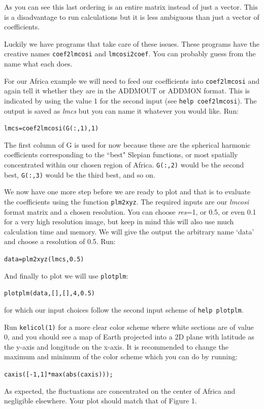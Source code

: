 \documentclass[11pt]{article}
\begin{document}
As you can see this last ordering is an entire matrix instead of just a vector. This is a disadvantage to run calculations but it is less ambiguous than just a vector of coefficients.


Luckily we have programs that take care of these issues. These programs have the creative names
\verb+coef2lmcosi+ and \verb+lmcosi2coef+. You can probably guess from the name what each does.

For our Africa example we will need to feed our coefficients into \verb+coef2lmcosi+ and again tell it whether they are in the ADDMOUT or ADDMON format. This is indicated by using the value 1 for the second input (see \verb+help coef2lmcosi+). The output is saved as \textit{lmcs} but you can name it whatever you would like. Run:

\verb+lmcs=coef2lmcosi(G(:,1),1)+

The first column of G is used for now because these are the spherical harmonic coefficients corresponding to the ``best" Slepian functions, or most spatially concentrated within our chosen region of Africa. \verb+G(:,2)+ would be the second best, \verb+G(:,3)+ would be the third best, and so on.

We now have one more step before we are ready to plot and that is to evaluate the coefficients using the function \verb+plm2xyz+. The required inputs are our \textit{lmcosi} format matrix and a chosen resolution. You can choose \textit{res}=1, or 0.5, or even 0.1 for a very high resolution image, but keep in mind this will also use much calculation time and memory.  We will give the output the arbitrary name `data' and choose  a resolution of 0.5. Run:

\verb+data=plm2xyz(lmcs,0.5)+

And finally to plot we will use \verb+plotplm+:

\verb+plotplm(data,[],[],4,0.5)+

for which our input choices follow the second input scheme of \verb+help plotplm+.

Run \verb+kelicol(1)+ for a more clear color scheme where white sections are of value 0, and you should see a map of Earth projected into a 2D plane with latitude as the y-axis and longitude on the x-axis. It is recommended to change the maximum and minimum of the color scheme which you can do by running:

\verb+caxis([-1,1]*max(abs(caxis)));+

As expected, the fluctuations are concentrated on the center of Africa and negligible elsewhere. Your plot should match that of Figure 1. \\
\end{document}
